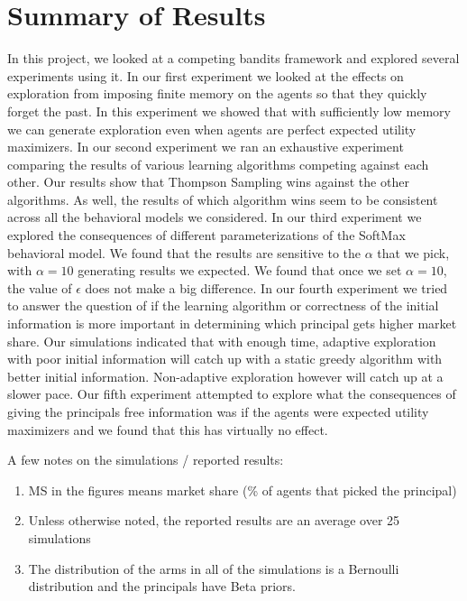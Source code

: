 \documentclass[11pt,letterpaper]{article}
\begin{document}
\section*{Summary of Results}
In this project, we looked at a competing bandits framework and explored several experiments using it. In our first experiment we looked at the effects on exploration from imposing finite memory on the agents so that they quickly forget the past. In this experiment we showed that with sufficiently low memory we can generate exploration even when agents are perfect expected utility maximizers. In our second experiment we ran an exhaustive experiment comparing the results of various learning algorithms competing against each other. Our results show that Thompson Sampling wins against the other algorithms. As well, the results of which algorithm wins seem to be consistent across all the behavioral models we considered. In our third experiment we explored the consequences of different parameterizations of the SoftMax behavioral model. We found that the results are sensitive to the $\alpha$ that we pick, with $\alpha = 10$ generating results we expected. We found that once we set $\alpha = 10$, the value of $\epsilon$ does not make a big difference. In our fourth experiment we tried to answer the question of if the learning algorithm or correctness of the initial information is more important in determining which principal gets higher market share. Our simulations indicated that with enough time, adaptive exploration with poor initial information will catch up with a static greedy algorithm with better initial information. Non-adaptive exploration however will catch up at a slower pace. Our fifth experiment attempted to explore what the consequences of giving the principals free information was if the agents were expected utility maximizers and we found that this has virtually no effect.

A few notes on the simulations / reported results:
\begin{enumerate}
\item MS in the figures means market share (\% of agents that picked the principal)
\item Unless otherwise noted, the reported results are an average over 25 simulations
\item The distribution of the arms in all of the simulations is a Bernoulli distribution and the principals have Beta priors.
\end{enumerate}
\end{document}
